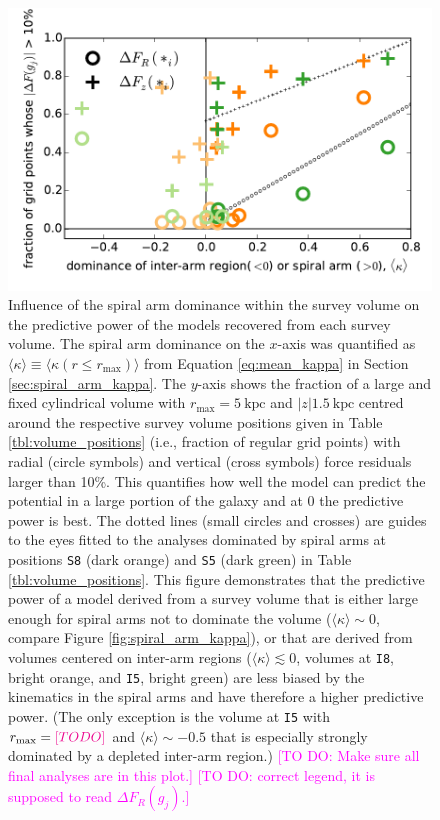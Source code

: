 \documentclass[iop,revtex4,numberedappendix,appendixfloats]{emulateapj}
\newcommand{\Wilma}[1]{\textcolor{Magenta}{#1}}
\begin{document}
\begin{figure}[!htbp]
\centering
\includegraphics[width=\columnwidth]{fig/MNdHHdiffSph2_plot_meankappa_vs_frac10grid_2.pdf}
\caption{Influence of the spiral arm dominance within the survey volume on the predictive power of the models recovered from each survey volume. The spiral arm dominance on the $x$-axis was quantified as $\langle \kappa \rangle \equiv \langle \kappa(r\leq r_\text{max})\rangle$ from Equation \eqref{eq:mean_kappa} in Section \ref{sec:spiral_arm_kappa}. The $y$-axis shows the fraction of a large and fixed cylindrical volume with $r_\text{max}=5~\text{kpc}$ and $|z|1.5~\text{kpc}$ centred around the respective survey volume positions given in Table \ref{tbl:volume_positions} (i.e., fraction of regular grid points) with radial (circle symbols) and vertical (cross symbols) force residuals larger than 10\%.  This quantifies how well the model can predict the potential in a large portion of the galaxy and at $0$ the predictive power is best. The dotted lines (small circles and crosses) are guides to the eyes fitted to the analyses dominated by spiral arms at positions \texttt{S8} (dark orange) and \texttt{S5} (dark green) in Table \ref{tbl:volume_positions}. This figure demonstrates that the predictive power of a model derived from a survey volume that is either large enough for spiral arms not to dominate the volume ($\langle \kappa \rangle \sim 0$, compare Figure \ref{fig:spiral_arm_kappa}), or that are derived from volumes centered on inter-arm regions ($\langle \kappa \rangle \lesssim 0$, volumes at \texttt{I8}, bright orange, and \texttt{I5}, bright green) are less biased by the kinematics in the spiral arms and have therefore a higher predictive power. (The only exception is the volume at \texttt{I5} with $r_\text{max}=\Wilma{[TO DO]}$ and $\langle \kappa \rangle \sim -0.5$ that is especially strongly dominated by a depleted inter-arm region.)  \Wilma{[TO DO: Make sure all final analyses are in this plot.]} \Wilma{[TO DO: correct legend, it is supposed to read $\Delta F_R(g_j)$.]}}
\label{fig:mean_kappa_vs_frac10_grid}
\end{figure}
\end{document}
